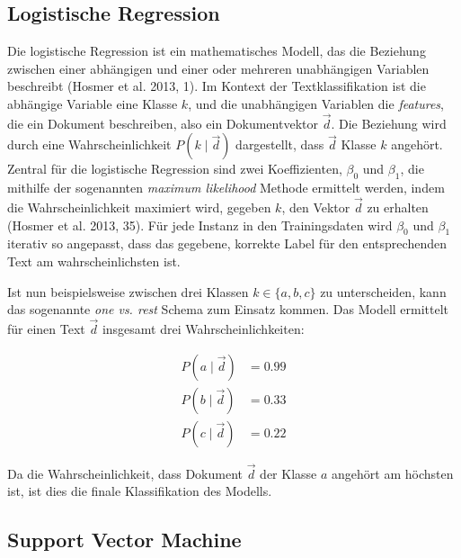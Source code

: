 \subsection{Logistische Regression}
\label{logistischeregression}
Die logistische Regression ist ein mathematisches Modell, das die Beziehung zwischen einer abhängigen und einer oder mehreren unabhängigen Variablen beschreibt (Hosmer et al. 2013, 1). Im Kontext der Textklassifikation ist die abhängige Variable eine Klasse $k$, und die unabhängigen Variablen die \textit{features}, die ein Dokument beschreiben, also ein Dokumentvektor $\vec{d}$. Die Beziehung wird durch eine Wahrscheinlichkeit $P(k \mid \vec{d})$ dargestellt, dass $\vec{d}$ Klasse $k$ angehört. Zentral für die logistische Regression sind zwei Koeffizienten, $\beta_{0}$ und $\beta_{1}$, die mithilfe der sogenannten \textit{maximum likelihood} Methode ermittelt werden, indem die Wahrscheinlichkeit maximiert wird, gegeben $k$, den Vektor $\vec{d}$ zu erhalten (Hosmer et al. 2013, 35). Für jede Instanz in den Trainingsdaten wird $\beta_{0}$ und $\beta_{1}$ iterativ so angepasst, dass das gegebene, korrekte Label für den entsprechenden Text am wahrscheinlichsten ist.

Ist nun beispielsweise zwischen drei Klassen $k \in \{a, b, c\}$ zu unterscheiden, kann das sogenannte \textit{one vs. rest} Schema zum Einsatz kommen. Das Modell ermittelt für einen Text $\vec{d}$ insgesamt drei Wahrscheinlichkeiten:

\begin{equation}
  \label{eq:eqn1}
    \begin{aligned}
      P(a \mid \vec{d}) &= 0.99        \\
      P(b \mid \vec{d}) &= 0.33        \\
      P(c \mid \vec{d}) &= 0.22                
    \end{aligned}
\end{equation}

Da die Wahrscheinlichkeit, dass Dokument $\vec{d}$ der Klasse $a$ angehört am höchsten ist, ist dies die finale Klassifikation des Modells.


\subsection{Support Vector Machine}
\label{supportvectormachine}

